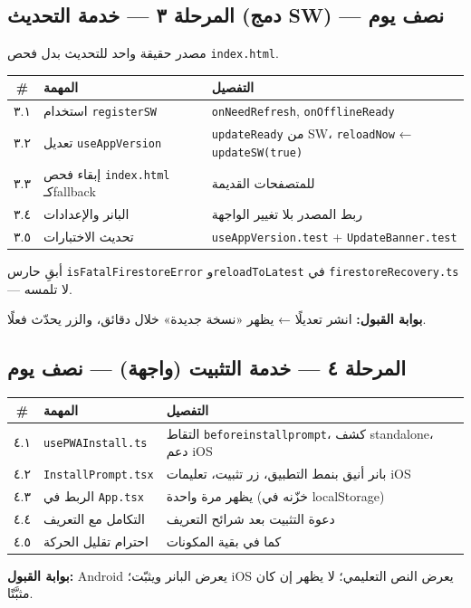 \documentclass[11pt]{article}
\newcommand{\code}[1]{\textcolor{darkbg}{\texttt{\small #1}}}
\begin{document}
\subsection{المرحلة ٣ — خدمة التحديث (دمج SW) — نصف يوم}
مصدر حقيقة واحد للتحديث بدل فحص \code{index.html}.
\begin{tabular}{@{}c p{6.5cm} p{5cm}@{}}
\toprule
\textbf{\#} & \textbf{المهمة} & \textbf{التفصيل} \\
\midrule
٣.١ & استخدام \code{registerSW} & \code{onNeedRefresh}, \code{onOfflineReady} \\
٣.٢ & تعديل \code{useAppVersion} & \code{updateReady} من SW، \code{reloadNow} ← \code{updateSW(true)} \\
٣.٣ & إبقاء فحص \code{index.html} كـfallback & للمتصفحات القديمة \\
٣.٤ & البانر والإعدادات & ربط المصدر بلا تغيير الواجهة \\
٣.٥ & تحديث الاختبارات & \code{useAppVersion.test} + \code{UpdateBanner.test} \\
\bottomrule
\end{tabular}
\begin{riskbox}
أبقِ حارس \code{isFatalFirestoreError} و\code{reloadToLatest} في \code{firestoreRecovery.ts} — لا تلمسه.
\end{riskbox}
\begin{okbox}
\textbf{بوابة القبول:} انشر تعديلًا ← يظهر «نسخة جديدة» خلال دقائق، والزر يحدّث فعلًا.
\end{okbox}

\subsection{المرحلة ٤ — خدمة التثبيت (واجهة) — نصف يوم}
\begin{tabular}{@{}c p{6.5cm} p{5cm}@{}}
\toprule
\textbf{\#} & \textbf{المهمة} & \textbf{التفصيل} \\
\midrule
٤.١ & \code{usePWAInstall.ts} & التقاط \code{beforeinstallprompt}، كشف standalone، دعم iOS \\
٤.٢ & \code{InstallPrompt.tsx} & بانر أنيق بنمط التطبيق، زر تثبيت، تعليمات iOS \\
٤.٣ & الربط في \code{App.tsx} & يظهر مرة واحدة (خزّنه في localStorage) \\
٤.٤ & التكامل مع التعريف & دعوة التثبيت بعد شرائح التعريف \\
٤.٥ & احترام تقليل الحركة & كما في بقية المكونات \\
\bottomrule
\end{tabular}
\begin{okbox}
\textbf{بوابة القبول:} Android يعرض البانر ويثبّت؛ iOS يعرض النص التعليمي؛ لا يظهر إن كان مثبَّتًا.
\end{okbox}
\end{document}
